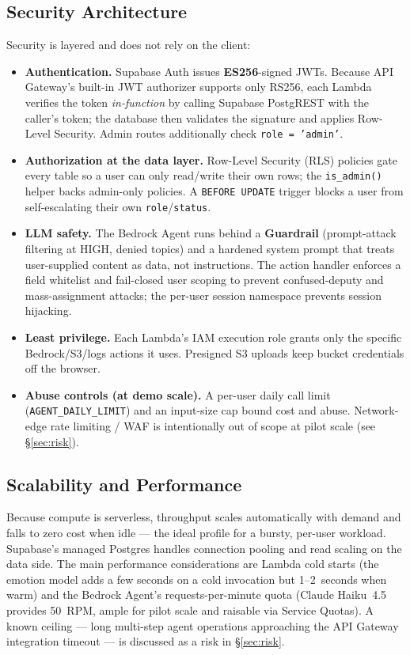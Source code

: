 \documentclass[a4paper,11pt]{article}
\begin{document}
	\subsection{Security Architecture}
	Security is layered and does not rely on the client:
	\begin{itemize}
		\item \textbf{Authentication.} Supabase Auth issues \textbf{ES256}-signed JWTs. Because
		      API Gateway's built-in JWT authorizer supports only RS256, each Lambda verifies the
		      token \emph{in-function} by calling Supabase PostgREST with the caller's token; the
		      database then validates the signature and applies Row-Level Security. Admin routes
		      additionally check \texttt{role = 'admin'}.
		\item \textbf{Authorization at the data layer.} Row-Level Security (RLS) policies gate
		      every table so a user can only read/write their own rows; the \texttt{is\_admin()}
		      helper backs admin-only policies. A \texttt{BEFORE UPDATE} trigger blocks a user
		      from self-escalating their own \texttt{role}/\texttt{status}.
		\item \textbf{LLM safety.} The Bedrock Agent runs behind a \textbf{Guardrail}
		      (prompt-attack filtering at HIGH, denied topics) and a hardened system prompt that
		      treats user-supplied content as data, not instructions. The action handler enforces
		      a field whitelist and fail-closed user scoping to prevent confused-deputy and
		      mass-assignment attacks; the per-user session namespace prevents session hijacking.
		\item \textbf{Least privilege.} Each Lambda's IAM execution role grants only the specific
		      Bedrock/S3/logs actions it uses. Presigned S3 uploads keep bucket credentials off
		      the browser.
		\item \textbf{Abuse controls (at demo scale).} A per-user daily call limit
		      (\texttt{AGENT\_DAILY\_LIMIT}) and an input-size cap bound cost and abuse.
		      Network-edge rate limiting / WAF is intentionally out of scope at pilot scale (see
		      \S\ref{sec:risk}).
	\end{itemize}

	\subsection{Scalability and Performance}
	Because compute is serverless, throughput scales automatically with demand and falls to
	zero cost when idle --- the ideal profile for a bursty, per-user workload. Supabase's
	managed Postgres handles connection pooling and read scaling on the data side. The main
	performance considerations are Lambda cold starts (the emotion model adds a few seconds on
	a cold invocation but 1--2~seconds when warm) and the Bedrock Agent's requests-per-minute
	quota (Claude Haiku~4.5 provides 50~RPM, ample for pilot scale and raisable via Service
	Quotas). A known ceiling --- long multi-step agent operations approaching the API Gateway
	integration timeout --- is discussed as a risk in \S\ref{sec:risk}.
\end{document}

